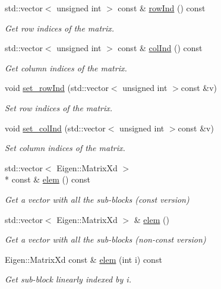 \begin{DoxyCompactItemize}
std\-::vector$<$ unsigned int $>$ const \& \hyperlink{classTspeed_1_1BaseMat_a4340f54ae8855520777976d76a054d25}{row\-Ind} () const 
\begin{DoxyCompactList}\small\item\em Get row indices of the matrix. \end{DoxyCompactList}\item 
std\-::vector$<$ unsigned int $>$ const \& \hyperlink{classTspeed_1_1BaseMat_a49b084a9e5a94fd0b188c7b2fd8eb1b6}{col\-Ind} () const 
\begin{DoxyCompactList}\small\item\em Get column indices of the matrix. \end{DoxyCompactList}\item 
void \hyperlink{classTspeed_1_1BaseMat_ae38cb2311d29d37b11692af1bd7cbb7d}{set\-\_\-row\-Ind} (std\-::vector$<$ unsigned int $>$const \&v)
\begin{DoxyCompactList}\small\item\em Set row indices of the matrix. \end{DoxyCompactList}\item 
void \hyperlink{classTspeed_1_1BaseMat_ac26f40dd7c982e596214df26e4d70931}{set\-\_\-col\-Ind} (std\-::vector$<$ unsigned int $>$const \&v)
\begin{DoxyCompactList}\small\item\em Set column indices of the matrix. \end{DoxyCompactList}\item 
std\-::vector$<$ Eigen\-::\-Matrix\-Xd $>$\\*
 const \& \hyperlink{classTspeed_1_1BaseMat_a71819b73e763c000d5ec02546f81c16f}{elem} () const 
\begin{DoxyCompactList}\small\item\em Get a vector with all the sub-\/blocks (const version) \end{DoxyCompactList}\item 
std\-::vector$<$ Eigen\-::\-Matrix\-Xd $>$ \& \hyperlink{classTspeed_1_1BaseMat_af29296b4ded5241e8813d40a0a032856}{elem} ()
\begin{DoxyCompactList}\small\item\em Get a vector with all the sub-\/blocks (non-\/const version) \end{DoxyCompactList}\item 
Eigen\-::\-Matrix\-Xd const \& \hyperlink{classTspeed_1_1BaseMat_abce23dbc10f2dea5894cf72ac6daee75}{elem} (int i) const 
\begin{DoxyCompactList}\small\item\em Get sub-\/block linearly indexed by i. \end{DoxyCompactList}\item 

\end{DoxyCompactItemize}
